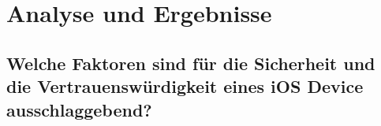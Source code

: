 %
%
%
% 


\chapter{Analyse und Ergebnisse}
\label{ch:Ergebnisse}


\section{Welche Faktoren sind für die Sicherheit und die Vertrauenswürdigkeit eines iOS Device ausschlaggebend?}
\label{sec:Frage1}

